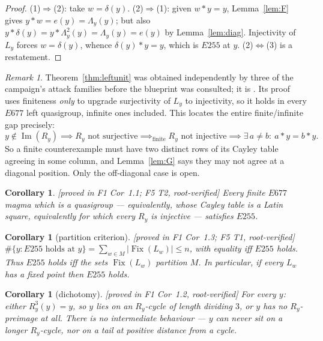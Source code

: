 \documentclass[11pt]{article}
\theoremstyle{plain}
\newtheorem{corollary}[theorem]{Corollary}
\theoremstyle{definition}
\theoremstyle{remark}
\newtheorem*{remark*}{Remark}
\numberwithin{equation}{section}
\newcommand{\op}{\mathbin{*}}
\newcommand{\Fix}{\operatorname{Fix}}
\newcommand{\Imm}{\operatorname{Im}}
\newcommand{\statusbox}[1]{{\small\sloppy\textsf{[#1]}}}
\newcommand{\PROVED}[1]{\statusbox{proved in #1, root-verified}}
\begin{document}
\begin{proof}
(1)$\Rightarrow$(2): take $w = \delta(y)$. (2)$\Rightarrow$(1): given $w\op y = y$,
Lemma~\ref{lem:F} gives $y\op w = e(y) = \Lambda_y(y)$; but also
$y\op \delta(y) = y\op \Lambda_y^2(y) = \Lambda_y(y) = e(y)$ by Lemma~\ref{lem:diag}.
Injectivity of $L_y$ forces $w = \delta(y)$, whence $\delta(y)\op y = y$, which is $E255$ at
$y$. (2)$\Leftrightarrow$(3) is a restatement.
\end{proof}

\begin{remark*}
Theorem~\ref{thm:leftunit} was obtained independently by three of the campaign's attack
families before the blueprint was consulted; it is \cite[Lemma~13.1(ii)]{blueprint}. Its
proof uses finiteness \emph{only} to upgrade surjectivity of $L_y$ to injectivity, so it
holds in every $E677$ left quasigroup, infinite ones included. This locates the entire
finite/infinite gap precisely:
\[
  y\notin\Imm(R_y) \implies R_y \text{ not surjective}
  \implies_{\text{finite}} R_y \text{ not injective}
  \implies \exists\, a\ne b:\ a\op y = b\op y .
\]
So a finite counterexample must have two distinct rows of its Cayley table agreeing in some
column, and Lemma~\ref{lem:G} says they may not agree at a diagonal position. Only the
off-diagonal case is open.
\end{remark*}

\begin{corollary}\label{cor:quasigroup}
\PROVED{F1 Cor~1.1; F5 T2}
Every finite $E677$ magma which is a quasigroup --- equivalently, whose Cayley table is a
Latin square, equivalently for which every $R_y$ is injective --- satisfies $E255$.
\end{corollary}

\begin{corollary}[partition criterion]\label{cor:partition}
\PROVED{F1 Cor~1.3; F5 T1}
$\#\{y: E255 \text{ holds at } y\} = \sum_{w\in M}|\Fix(L_w)| \le n$, with equality iff
$E255$ holds. Thus $E255$ holds iff the sets $\Fix(L_w)$ \emph{partition} $M$. In particular,
if every $L_w$ has a fixed point then $E255$ holds.
\end{corollary}

\begin{corollary}[dichotomy]\label{cor:dichotomy}
\PROVED{F1 Cor~1.2}
For every $y$: either $R_y^3(y) = y$, so $y$ lies on an $R_y$-cycle of length dividing $3$,
or $y$ has no $R_y$-preimage at all. There is no intermediate behaviour --- $y$ can never
sit on a longer $R_y$-cycle, nor on a tail at positive distance from a cycle.
\end{corollary}
\end{document}
